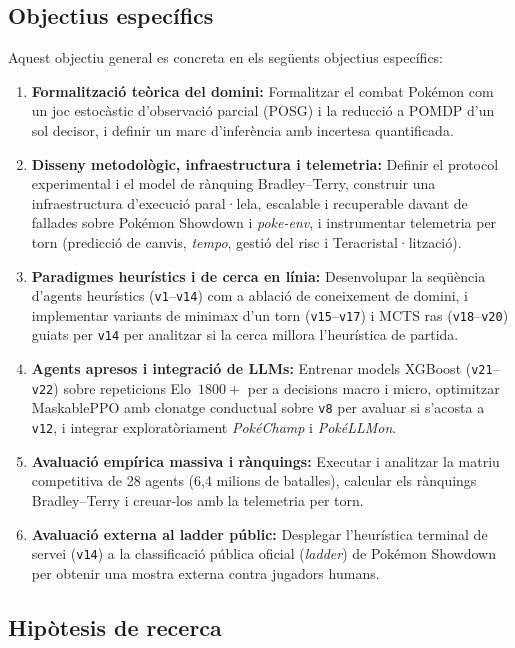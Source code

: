 \subsection{Objectius específics}
\label{subsec:objectius_especifics}

Aquest objectiu general es concreta en els següents objectius específics:
\begin{enumerate}
    \item \textbf{Formalització teòrica del domini:} Formalitzar el combat Pokémon com un joc estocàstic d'observació parcial (POSG) i la reducció a POMDP d'un sol decisor, i definir un marc d'inferència amb incertesa quantificada.
    \item \textbf{Disseny metodològic, infraestructura i telemetria:} Definir el protocol experimental i el model de rànquing Bradley--Terry, construir una infraestructura d'execució paral·lela, escalable i recuperable davant de fallades sobre Pokémon Showdown i \textit{poke-env}, i instrumentar telemetria per torn (predicció de canvis, \emph{tempo}, gestió del risc i Teracristal·lització).
    \item \textbf{Paradigmes heurístics i de cerca en línia:} Desenvolupar la seqüència d'agents heurístics (\texttt{v1}--\texttt{v14}) com a ablació de coneixement de domini, i implementar variants de minimax d'un torn (\texttt{v15}--\texttt{v17}) i MCTS ras (\texttt{v18}--\texttt{v20}) guiats per \texttt{v14} per analitzar si la cerca millora l'heurística de partida.
    \item \textbf{Agents apresos i integració de LLMs:} Entrenar models XGBoost (\texttt{v21}--\texttt{v22}) sobre repeticions Elo~$1800+$ per a decisions macro i micro, optimitzar MaskablePPO amb clonatge conductual sobre \texttt{v8} per avaluar si s'acosta a \texttt{v12}, i integrar exploratòriament \textit{PokéChamp} i \textit{PokéLLMon}.
    \item \textbf{Avaluació empírica massiva i rànquings:} Executar i analitzar la matriu competitiva de 28 agents (6,4 milions de batalles), calcular els rànquings Bradley--Terry i creuar-los amb la telemetria per torn.
    \item \textbf{Avaluació externa al ladder públic:} Desplegar l'heurística terminal de servei (\texttt{v14}) a la classificació pública oficial (\emph{ladder}) de Pokémon Showdown per obtenir una mostra externa contra jugadors humans.
\end{enumerate}

\subsection{Hipòtesis de recerca}
\label{subsec:hipotesis}

